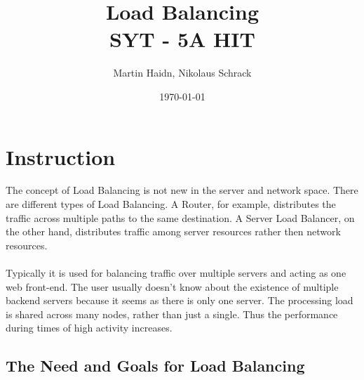 \documentclass[12p]{article}
\author{Martin Haidn, Nikolaus Schrack}
\title{\Huge{Load Balancing}\\\Large{SYT - 5A HIT}}
\date{\today}
\begin{document}
	\maketitle
	
	\newpage
	\tableofcontents
	
	\newpage
	\section{Instruction}
	
	The concept of Load Balancing is not new in the server and network space. There are different types of Load Balancing. A Router, for example, distributes the traffic across multiple paths to the same destination. A Server Load Balancer, on the other hand, distributes traffic among server resources rather then network resources. \cite{lb_SFC}  \\ \\
	Typically it is used for balancing traffic over multiple servers and acting as one web front-end. The user usually doesn't know about the existence of multiple backend servers because it seems as there is only one server. The processing load is shared across many nodes, rather than just a single. Thus the performance during times of high activity increases.
	\cite{liquidweb}
	
	
	\subsection{The Need and Goals for Load Balancing}
	
\end{document}
